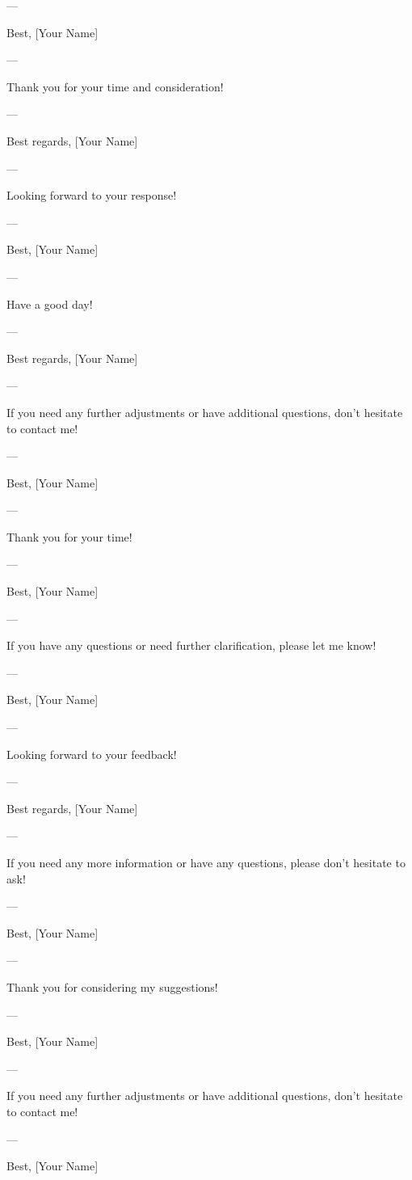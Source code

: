--- 

Best,  
[Your Name]  

--- 

Thank you for your time and consideration! 

--- 

Best regards,  
[Your Name]  

--- 

Looking forward to your response! 

--- 

Best,  
[Your Name]  

--- 

Have a good day! 

--- 

Best regards,  
[Your Name]  

--- 

If you need any further adjustments or have additional questions, don't hesitate to contact me! 

--- 

Best,  
[Your Name]  

--- 

Thank you for your time! 

--- 

Best,  
[Your Name]  

--- 

If you have any questions or need further clarification, please let me know! 

--- 

Best,  
[Your Name]  

--- 

Looking forward to your feedback! 

--- 

Best regards,  
[Your Name]  

--- 

If you need any more information or have any questions, please don't hesitate to ask! 

--- 

Best,  
[Your Name]  

--- 

Thank you for considering my suggestions! 

--- 

Best,  
[Your Name]  

--- 

If you need any further adjustments or have additional questions, don't hesitate to contact me! 

--- 

Best,  
[Your Name]  

